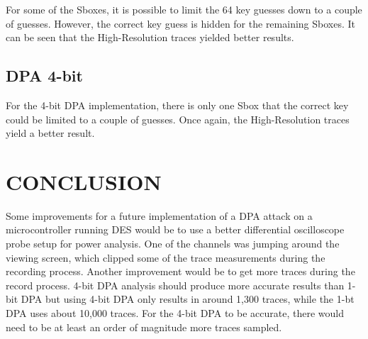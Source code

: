 \documentclass[letterpaper, 10 pt, conference]{ieeeconf}  %
\begin{document}
For some of the Sboxes, it is possible to limit the 64 key guesses down to a couple of guesses.  However, the correct key guess is hidden for the remaining Sboxes.  It can be seen that the High-Resolution traces yielded better results. 

\subsection{DPA 4-bit}

For the 4-bit DPA implementation, there is only one Sbox that the correct key could be limited to a couple of guesses.  Once again, the High-Resolution traces yield a better result.


\section{CONCLUSION}

Some improvements for a future implementation of a DPA attack on a microcontroller running DES would be to use a better differential oscilloscope probe setup for power analysis. One of the channels was jumping around the viewing screen, which clipped some of the trace measurements during the recording process. Another improvement would be to get more traces during the record process. 4-bit DPA analysis should produce more accurate results than 1-bit DPA but using 4-bit DPA only results
in around 1,300 traces, while the 1-bt DPA uses about 10,000 traces. For the 4-bit DPA to be accurate, there would need to be at least an order of magnitude more traces sampled.


\addtolength{\textheight}{-12cm}   %







\end{document}

